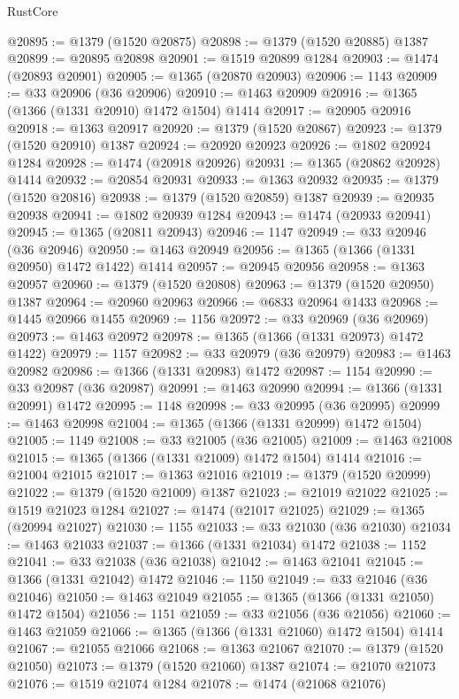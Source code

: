 \begin{lexlean}{RustCore}
\begin{coremodule}
@20895 := @1379 (@1520 @20875)
@20898 := @1379 (@1520 @20885) @1387
@20899 := @20895 @20898
@20901 := @1519 @20899 @1284
@20903 := @1474 (@20893 @20901)
@20905 := @1365 (@20870 @20903)
@20906 := 1143
@20909 := @33 @20906 (@36 @20906)
@20910 := @1463 @20909
@20916 := @1365 (@1366 (@1331 @20910) @1472 @1504) @1414
@20917 := @20905 @20916
@20918 := @1363 @20917
@20920 := @1379 (@1520 @20867)
@20923 := @1379 (@1520 @20910) @1387
@20924 := @20920 @20923
@20926 := @1802 @20924 @1284
@20928 := @1474 (@20918 @20926)
@20931 := @1365 (@20862 @20928) @1414
@20932 := @20854 @20931
@20933 := @1363 @20932
@20935 := @1379 (@1520 @20816)
@20938 := @1379 (@1520 @20859) @1387
@20939 := @20935 @20938
@20941 := @1802 @20939 @1284
@20943 := @1474 (@20933 @20941)
@20945 := @1365 (@20811 @20943)
@20946 := 1147
@20949 := @33 @20946 (@36 @20946)
@20950 := @1463 @20949
@20956 := @1365 (@1366 (@1331 @20950) @1472 @1422) @1414
@20957 := @20945 @20956
@20958 := @1363 @20957
@20960 := @1379 (@1520 @20808)
@20963 := @1379 (@1520 @20950) @1387
@20964 := @20960 @20963
@20966 := @6833 @20964 @1433
@20968 := @1445 @20966 @1455
@20969 := 1156
@20972 := @33 @20969 (@36 @20969)
@20973 := @1463 @20972
@20978 := @1365 (@1366 (@1331 @20973) @1472 @1422)
@20979 := 1157
@20982 := @33 @20979 (@36 @20979)
@20983 := @1463 @20982
@20986 := @1366 (@1331 @20983) @1472
@20987 := 1154
@20990 := @33 @20987 (@36 @20987)
@20991 := @1463 @20990
@20994 := @1366 (@1331 @20991) @1472
@20995 := 1148
@20998 := @33 @20995 (@36 @20995)
@20999 := @1463 @20998
@21004 := @1365 (@1366 (@1331 @20999) @1472 @1504)
@21005 := 1149
@21008 := @33 @21005 (@36 @21005)
@21009 := @1463 @21008
@21015 := @1365 (@1366 (@1331 @21009) @1472 @1504) @1414
@21016 := @21004 @21015
@21017 := @1363 @21016
@21019 := @1379 (@1520 @20999)
@21022 := @1379 (@1520 @21009) @1387
@21023 := @21019 @21022
@21025 := @1519 @21023 @1284
@21027 := @1474 (@21017 @21025)
@21029 := @1365 (@20994 @21027)
@21030 := 1155
@21033 := @33 @21030 (@36 @21030)
@21034 := @1463 @21033
@21037 := @1366 (@1331 @21034) @1472
@21038 := 1152
@21041 := @33 @21038 (@36 @21038)
@21042 := @1463 @21041
@21045 := @1366 (@1331 @21042) @1472
@21046 := 1150
@21049 := @33 @21046 (@36 @21046)
@21050 := @1463 @21049
@21055 := @1365 (@1366 (@1331 @21050) @1472 @1504)
@21056 := 1151
@21059 := @33 @21056 (@36 @21056)
@21060 := @1463 @21059
@21066 := @1365 (@1366 (@1331 @21060) @1472 @1504) @1414
@21067 := @21055 @21066
@21068 := @1363 @21067
@21070 := @1379 (@1520 @21050)
@21073 := @1379 (@1520 @21060) @1387
@21074 := @21070 @21073
@21076 := @1519 @21074 @1284
@21078 := @1474 (@21068 @21076)

\end{coremodule}
\end{lexlean}

